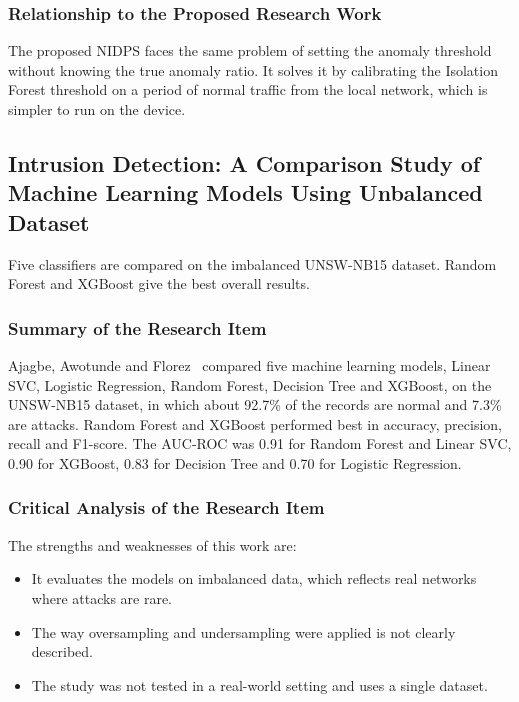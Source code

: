 \subsubsection{Relationship to the Proposed Research Work}\label{sec:3.2.11.3}

\noindent The proposed NIDPS faces the same problem of setting the anomaly threshold without knowing the true anomaly ratio. It solves it by calibrating the Isolation Forest threshold on a period of normal traffic from the local network, which is simpler to run on the device.

\subsection{Intrusion Detection: A Comparison Study of Machine Learning Models Using Unbalanced Dataset}\label{sec:3.2.12}

\noindent Five classifiers are compared on the imbalanced UNSW-NB15 dataset. Random Forest and XGBoost give the best overall results.

\subsubsection{Summary of the Research Item}\label{sec:3.2.12.1}

\noindent Ajagbe, Awotunde and Florez~\cite{lr:ajagbe2024} compared five machine learning models, Linear SVC, Logistic Regression, Random Forest, Decision Tree and XGBoost, on the UNSW-NB15 dataset, in which about 92.7\% of the records are normal and 7.3\% are attacks. Random Forest and XGBoost performed best in accuracy, precision, recall and F1-score. The AUC-ROC was 0.91 for Random Forest and Linear SVC, 0.90 for XGBoost, 0.83 for Decision Tree and 0.70 for Logistic Regression.

\subsubsection{Critical Analysis of the Research Item}\label{sec:3.2.12.2}

\noindent The strengths and weaknesses of this work are:

\begin{itemize}
\item It evaluates the models on imbalanced data, which reflects real networks where attacks are rare.
\item The way oversampling and undersampling were applied is not clearly described.
\item The study was not tested in a real-world setting and uses a single dataset.
\end{itemize}


